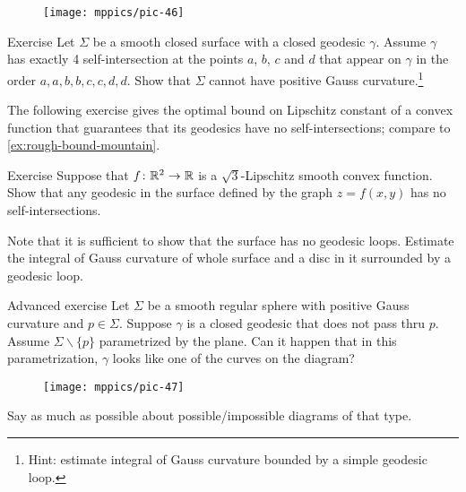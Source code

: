 {

\begin{wrapfigure}[4]{r}{32 mm}
\vskip-12mm
\centering
\texttt{[image: mppics/pic-46]}
\vskip-0mm
\end{wrapfigure}

\begin{thm}{Exercise}\label{ex:aabbccdd}
Let $\Sigma$ be a smooth closed surface with a closed geodesic $\gamma$.
Assume $\gamma$ has exactly 4 self-intersection at the points $a$, $b$, $c$ and $d$ that appear on $\gamma$ in the order $a,a,b,b,c,c,d,d$.
Show that $\Sigma$ cannot have positive Gauss curvature.\footnote{Hint: estimate integral of Gauss curvature bounded by a simple geodesic loop.}
\end{thm}

The following exercise gives the optimal bound on Lipschitz constant of a convex function that guarantees that its geodesics have no self-intersections;
compare to \ref{ex:rough-bound-mountain}.

\begin{thm}{Exercise}\label{ex:sqrt(3)}
Suppose that $f\colon\mathbb{R}^2\to\mathbb{R}$ is a $\sqrt{3}$-Lipschitz smooth convex function.
Show that any geodesic in the surface defined by the graph $z=f(x,y)$ has no self-intersections.
\end{thm}

 Note that it is sufficient to show that the surface has no geodesic loops.
Estimate the integral of Gauss curvature of whole surface and a disc in it surrounded by a geodesic loop.

\begin{thm}{Advanced exercise}
Let $\Sigma$ be a smooth regular sphere with positive Gauss curvature and $p\in\Sigma$. 
Suppose $\gamma$ is a closed geodesic that does not pass thru $p$.
Assume $\Sigma\backslash\{p\}$ parametrized by the plane.
Can it happen that in this parametrization,  $\gamma$ looks like one of the curves on the diagram?
\begin{figure}[h!]
\vskip-0mm
\centering
\texttt{[image: mppics/pic-47]}
\vskip-0mm
\end{figure}
Say as much as possible about possible/impossible diagrams of that type.
\end{thm}

}
